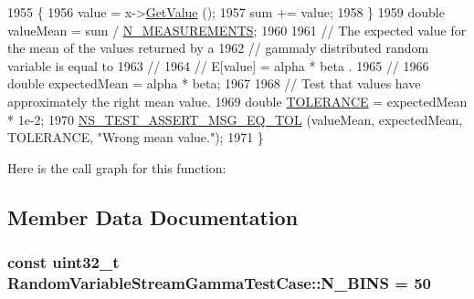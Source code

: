 \begin{DoxyCode}
1955     \{
1956       value = x->\hyperlink{classns3_1_1GammaRandomVariable_a4bc336892413eab5ba6e1a046cda8bde}{GetValue} ();
1957       sum += value;
1958     \}
1959   \textcolor{keywordtype}{double} valueMean = sum / \hyperlink{classRandomVariableStreamGammaTestCase_a7a498087c9e38b217f8253981df88c6d}{N\_MEASUREMENTS};
1960 
1961   \textcolor{comment}{// The expected value for the mean of the values returned by a}
1962   \textcolor{comment}{// gammaly distributed random variable is equal to }
1963   \textcolor{comment}{//}
1964   \textcolor{comment}{//     E[value]  =  alpha * beta  .}
1965   \textcolor{comment}{//}
1966   \textcolor{keywordtype}{double} expectedMean = alpha * beta;
1967 
1968   \textcolor{comment}{// Test that values have approximately the right mean value.}
1969   \textcolor{keywordtype}{double} \hyperlink{spectrum-value-test_8cc_a30c17564229ec2e37dfea9c6c9ad643e}{TOLERANCE} = expectedMean * 1e-2;
1970   \hyperlink{group__testing_ga9e7861b56b4e70db3b56044cb7a28e41}{NS\_TEST\_ASSERT\_MSG\_EQ\_TOL} (valueMean, expectedMean, TOLERANCE, \textcolor{stringliteral}{"Wrong mean
       value."}); 
1971 \}
\end{DoxyCode}


Here is the call graph for this function\+:




\subsection{Member Data Documentation}
\subsubsection[{\texorpdfstring{N\+\_\+\+B\+I\+NS}{N_BINS}}]{\setlength{\rightskip}{0pt plus 5cm}const uint32\+\_\+t Random\+Variable\+Stream\+Gamma\+Test\+Case\+::\+N\+\_\+\+B\+I\+NS = 50\hspace{0.3cm}{\ttfamily [static]}}\hypertarget{classRandomVariableStreamGammaTestCase_ab4a9effbc835a0a3ed7925cf79b09c61}{}\label{classRandomVariableStreamGammaTestCase_ab4a9effbc835a0a3ed7925cf79b09c61}
